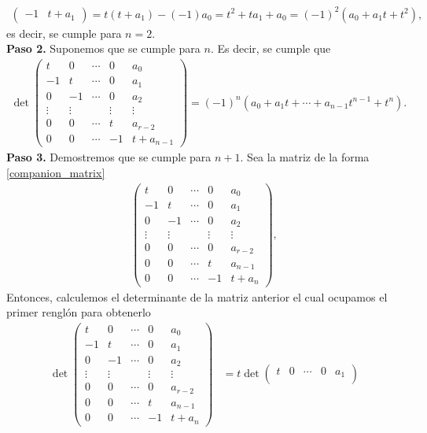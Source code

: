 \documentclass[11pt,letterpaper]{article}
\begin{document}
\begin{enumerate}
\begin{align*}
\begin{pmatrix}
-1& t+a_1
\end{pmatrix}=t(t+a_1)-(-1)a_0=t^2+ta_1+a_0=(-1)^2(a_0+a_1t+t^2),
\end{align*}
es decir, se cumple para $n=2$.\\
\textbf{Paso 2.} Suponemos que se cumple para $n$. Es decir, se cumple que 
\begin{align*}
\det \begin{pmatrix}
t & 0 & \cdots & 0 & a_0\\
-1 & t & \cdots & 0 & a_1\\
0 & -1 & \cdots & 0 & a_2\\
\vdots & \vdots &  & \vdots &\vdots\\
0 & 0 & \cdots & t & a_{r-2}\\
0 & 0 & \cdots & -1 & t+a_{n-1}
\end{pmatrix}=(-1)^n(a_0+a_1t+\cdots+a_{n-1}t^{n-1}+t^n).
\end{align*}
\textbf{Paso 3.} Demostremos que se cumple para $n+1$. Sea la matriz de la forma \ref{companion_matrix}
\begin{align*}
\begin{pmatrix}
t & 0 & \cdots & 0 & a_0\\
-1 & t & \cdots & 0 & a_1\\
0 & -1 & \cdots & 0 & a_2\\
\vdots & \vdots &  & \vdots &\vdots\\
0 & 0 & \cdots & 0 & a_{r-2}\\
0 & 0 & \cdots & t & a_{n-1}\\
0 & 0 & \cdots & -1 & t+a_{n}
\end{pmatrix},
\end{align*}
Entonces, calculemos el determinante de la matriz anterior el cual ocupamos el primer renglón para obtenerlo
\begin{align*}
\det \begin{pmatrix}
t & 0 & \cdots & 0 & a_0\\
-1 & t & \cdots & 0 & a_1\\
0 & -1 & \cdots & 0 & a_2\\
\vdots & \vdots &  & \vdots &\vdots\\
0 & 0 & \cdots & 0 & a_{r-2}\\
0 & 0 & \cdots & t & a_{n-1}\\
0 & 0 & \cdots & -1 & t+a_{n}
\end{pmatrix}&= t\det 
\begin{pmatrix}
t & 0 & \cdots & 0 & a_1\\

\end{pmatrix}
\end{align*}
\end{enumerate}
\end{document}
